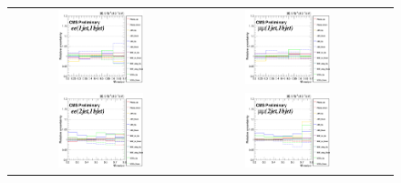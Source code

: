 \begin{figure}[ht]
  \begin{center}
    \begin{tabular}{ccc}
      \includegraphics[width=0.49\textwidth]{figures/tW/fig/Step2/uncertainties/ee/Shape_uncert_H_MLP_1jet_1bjet_comb.png} &
      \includegraphics[width=0.49\textwidth]{figures/tW/fig/Step2/uncertainties/mumu/Shape_uncert_H_MLP_1jet_1bjet_comb.png}\\
      \includegraphics[width=0.49\textwidth]{figures/tW/fig/Step2/uncertainties/ee/Shape_uncert_H_MLP_2jet_1bjet_comb.png} &
      \includegraphics[width=0.49\textwidth]{figures/tW/fig/Step2/uncertainties/mumu/Shape_uncert_H_MLP_2jet_1bjet_comb.png}\\

\end{tabular}
\end{center}
\end{figure}
